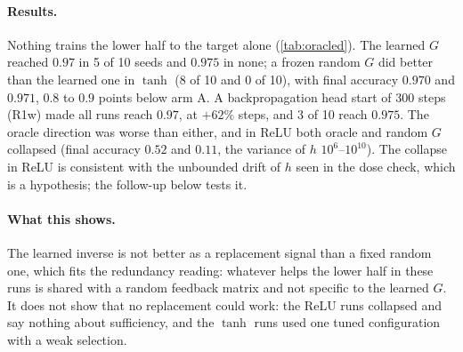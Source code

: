 \begin{table}[t]
\centering\small
\caption{Check 5: lower half trained by the meeting signal alone (backpropagation cut at $h$). Seeds reaching $0.97$ and $0.975$, change in steps to target against arm A of the same activation (a run that misses the target is charged all 3\,000 steps, which is why several groups share the same ceiling value), and final validation accuracy.}
\label{tab:oracled}
\end{table}

\paragraph{Results.} Nothing trains the lower half to the target alone (\cref{tab:oracled}). The learned $G$ reached $0.97$ in 5 of 10 seeds and $0.975$ in none; a frozen random $G$ did better than the learned one in $\tanh$ (8 of 10 and 0 of 10), with final accuracy $0.970$ and $0.971$, $0.8$ to $0.9$ points below arm A. A backpropagation head start of 300 steps (R1w) made all runs reach $0.97$, at $+62\%$ steps, and 3 of 10 reach $0.975$. The oracle direction was worse than either, and in ReLU both oracle and random $G$ collapsed (final accuracy $0.52$ and $0.11$, the variance of $h$ $10^6$--$10^{10}$). The collapse in ReLU is consistent with the unbounded drift of $h$ seen in the dose check, which is a hypothesis; the follow-up below tests it.

\paragraph{What this shows.} The learned inverse is not better as a replacement signal than a fixed random one, which fits the redundancy reading: whatever helps the lower half in these runs is shared with a random feedback matrix and not specific to the learned $G$. It does not show that no replacement could work: the ReLU runs collapsed and say nothing about sufficiency, and the $\tanh$ runs used one tuned configuration with a weak selection.

